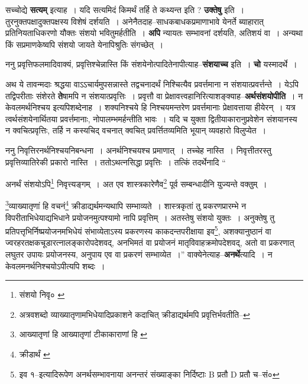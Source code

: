 \documentclass[article,12pt,a4paper]{memoir}
\begin{document}
	  \pstart सच्चोद्ये \textbf{सत्यम्} इत्याह । यदि सत्यमिदं किमर्थं तर्हि \leavevmode{} ते कथ्यन्त इति ? \textbf{उक्तेषु} इति । तुरनुक्तपक्षादुक्तपक्षस्य विशेषं दर्शयति । अनेनैतदाह--साधकबाधकप्रमाणाभावे येनर्ते ब्याहारात् प्रतिनियताधिकरणो यौक्तः संशयो भवितुमर्हतीति । \textbf{अपि} न्यायतः सम्भावनां दर्शयति, अतिशयं वा । अन्यथा किं सप्रमाणकेष्वपि संशयो जायते येनापिश्रुतिः संगच्छेत् ।
	\pend
      

	  \pstart ननु प्रवृत्तिफलमादिवाक्यं, प्रवृत्तिश्चेन्नास्ति किं संशयेनोत्पादितेनापीत्याह--\textbf{संशयाच्च} इति । \textbf{चो} यस्मादर्थे ।
	\pend
      

	  \pstart अथ ये तावन्मदाः श्रद्धया वाऽऽचार्यमुपसन्नास्ते तद्वचनादर्थं निश्चित्यैव प्रवर्त्तमाना न संशयात्प्रवर्त्तन्ते । येऽपि तद्विपरीताः संशेरते \textbf{ते}षामपि न संशयात्प्रवृत्तिः । प्रवृत्तौ वा प्रेक्षावत्त्वहानिरित्याशङ्क्याह--\textbf{अर्थसंशयोपीति} । न केवलमर्थनिश्चय इत्यपिशब्देनाह । शक्यनिश्चये हि निश्चयमन्तरेण प्रवर्त्तमानाः प्रेक्षावत्ताया हीयेरन् । यत्र त्वर्थसंशयेनार्थितया प्रवर्त्तमानाः, नोपालम्भमर्हन्तीति भावः । यदि च युक्ता द्वितीयाकारानुप्रवेशेन संशयानस्य न क्वचित्प्रवृत्तिः, तर्हि न कस्यचिद् वचनात् क्वचित् प्रवर्त्तितव्यमिति भूयान् व्यवहारो विलुप्येत ।
	\pend
      

	  \pstart ननु निवृत्तिरनर्थनिश्चयनिबन्धना । अनर्थनिश्चयश्च प्रमाणात् । तच्चेह नास्ति । निवृत्तीतरस्तु प्रवृत्तिव्यातिरेकी प्रकारो नास्ति । ततोऽथत्नसिद्धा प्रवृत्तिः । तत्किं तदर्थेनादि \leavevmode{} “
	  
	अनर्थं संशयोऽपि\footnote{संशयो निवृ० \cite{dp-msA} \cite{dp-edP} \cite{dp-edH} \cite{dp-edE} \cite{dp-edN}} निवृत्त्यङ्गम् । अत एव शास्त्रकारेणैव\footnote{अत्रवशब्दो व्याख्यातृणामभिधेयादिप्रकाशने कदाचित् क्रीडाद्यर्थमपि प्रवृत्तिर्भवतीति--\cite{dp-msD-n}} पूर्व सम्बन्धादीनि युज्यन्ते वक्तुम् । 
	  
	\footnote{आख्यातृणां हि \cite{dp-edE} \cite{dp-edN} आख्यातृणां टीकाकाराणां हि \cite{dp-msB}}व्याख्यातृणां हि वचनं\footnote{क्रीडार्थं \cite{dp-msA} \cite{dp-edP} \cite{dp-edE}} क्रीडाद्यर्थमन्यथापि सम्भाव्यते । शास्त्रकृतां तु प्रकरणप्रारम्भे न विपरीताभिधेयाद्यभिधाने प्रयोजनमुत्पश्यामो नापि प्रवृत्तिम् । अतस्तेषु संशयो युक्तः । अनुक्तेषु तु प्रतिपत्तृभिर्निष्प्रयोजनमभिधेयं संभाव्येताऽस्य प्रकरणस्य काकदन्तपरीक्षाया इव\footnote{इव १--इत्यादिरूपेण अनर्थसम्भावनाया अनन्तरं संख्याङ्का निर्दिष्टाः B प्रतौ D प्रतौ च--सं०}, अशक्यानुष्ठानं वा ज्वरहरतक्षकचूडारत्नालङ्कारोपदेशवद्, अनभिमतं वा प्रयोजनं मातृविवाहक्रमोपदेशवद्, अतो वा प्रकरणात् लघुतर उपायः प्रयोजनस्य, अनुपाय एव वा प्रकरणं सम्भाव्येत ।” वाक्येनेत्याह--\textbf{अनर्थे}त्यादि । न केवलमनर्थनिश्चयोऽपीत्यपि शब्दः ।
	\pend
      
\end{document}
